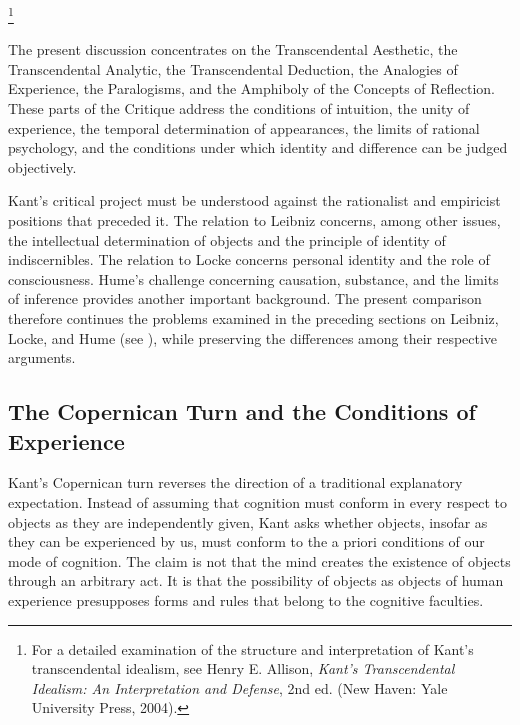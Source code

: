 \footnote{For a detailed examination of the structure
and interpretation of Kant's transcendental idealism,
see Henry E. Allison, \textit{Kant's Transcendental
Idealism: An Interpretation and Defense}, 2nd ed.
(New Haven: Yale University Press, 2004).}

\label{para:VS.B01.P01.C08.S10.SS02.P003}

The present discussion concentrates on the Transcendental
Aesthetic, the Transcendental Analytic, the Transcendental
Deduction, the Analogies of Experience, the Paralogisms,
and the Amphiboly of the Concepts of Reflection. These
parts of the Critique address the conditions of intuition,
the unity of experience, the temporal determination of
appearances, the limits of rational psychology, and the
conditions under which identity and difference can be
judged objectively.

\label{para:VS.B01.P01.C08.S10.SS02.P004}

Kant's critical project must be understood against the
rationalist and empiricist positions that preceded it.
The relation to Leibniz concerns, among other issues,
the intellectual determination of objects and the
principle of identity of indiscernibles. The relation
to Locke concerns personal identity and the role of
consciousness. Hume's challenge concerning causation,
substance, and the limits of inference provides another
important background. The present comparison therefore
continues the problems examined in the preceding sections
on Leibniz, Locke, and Hume (see ), while preserving the
differences among their respective arguments.
\cite{KantCritiquePureReason}



\subsection{The Copernican Turn and the Conditions of Experience}
\label{subsec:ch08-kant-copernican-turn}

\label{para:VS.B01.P01.C08.S10.SS03.P001}

Kant's Copernican turn reverses the direction of a
traditional explanatory expectation. Instead of assuming
that cognition must conform in every respect to objects
as they are independently given, Kant asks whether
objects, insofar as they can be experienced by us,
must conform to the a priori conditions of our mode
of cognition. The claim is not that the mind creates
the existence of objects through an arbitrary act.
It is that the possibility of objects as objects of
human experience presupposes forms and rules that
belong to the cognitive faculties.
\cite{KantCritiquePureReason}

